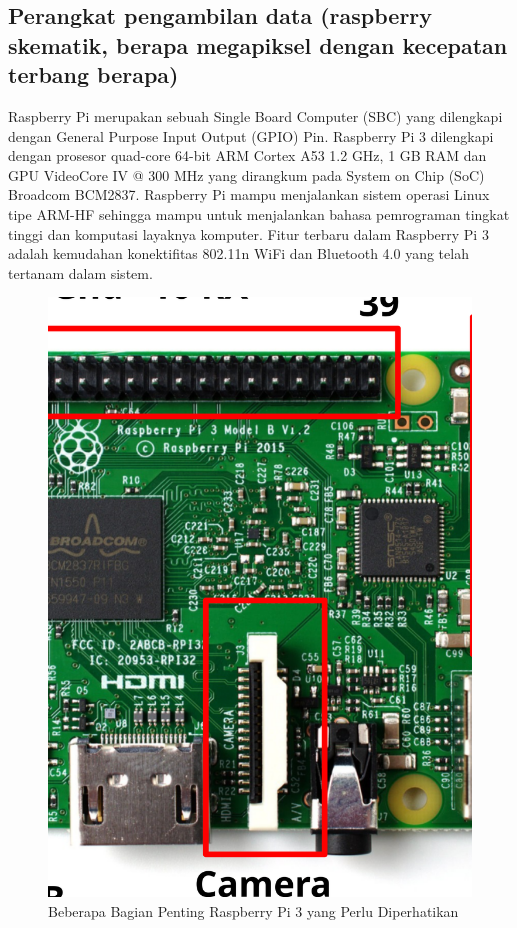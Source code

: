 \subsection{ Perangkat pengambilan data (raspberry skematik, berapa megapiksel dengan kecepatan terbang berapa)}

Raspberry Pi merupakan sebuah Single Board Computer (SBC) yang dilengkapi dengan General Purpose Input Output (GPIO) Pin. Raspberry Pi 3 dilengkapi dengan prosesor quad-core 64-bit ARM Cortex A53 1.2 GHz, 1 GB RAM dan GPU VideoCore IV @ 300 MHz yang dirangkum pada System on Chip (SoC) Broadcom BCM2837. Raspberry Pi mampu menjalankan sistem operasi Linux tipe ARM-HF sehingga mampu untuk menjalankan bahasa pemrograman tingkat tinggi dan komputasi layaknya komputer. Fitur terbaru dalam Raspberry Pi 3 adalah kemudahan konektifitas 802.11n WiFi dan Bluetooth 4.0 yang telah tertanam dalam sistem.

\begin{figure}[ht]
 \centering
 \includegraphics[width=\textwidth]{raspi_spec}
 \caption{Beberapa Bagian Penting Raspberry Pi 3 yang Perlu Diperhatikan}
 \label{fig:raspi_spec}   
\end{figure} 

